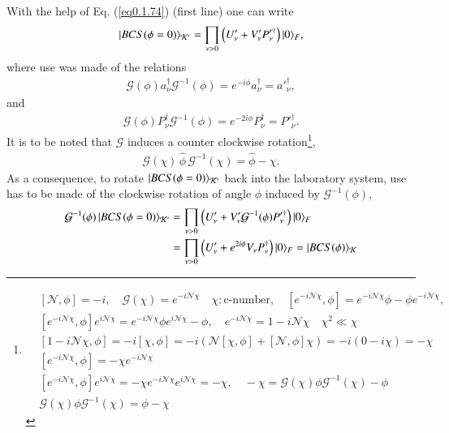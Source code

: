 With the help of Eq. (\ref{eq0.1.74}) (first line) one can write
\begin{align}\label{eq0.1.84}
|{BCS(\phi=0)} \rangle_{\mathcal K'}=\prod_{\nu>0}\left(U'_\nu+V'_\nu P_\nu'^\dagger\right)|{0} \rangle_F,
\end{align}
where use was made of the relations
\begin{align}\label{eq0.1.85}
\mathcal G(\phi)a^\dagger_\nu \mathcal G^{-1}(\phi)=e^{-i\phi}a^\dagger_\nu=a'^\dagger_\nu,
\end{align}
and 
\begin{align}\label{eq0.1.86}
\mathcal G(\phi)P^\dagger_\nu \mathcal G^{-1}(\phi)=e^{-2i\phi}P^\dagger_\nu=P'^\dagger_\nu.
\end{align}
It is to be noted that $\mathcal G$ induces a counter clockwise rotation\footnote{
	\begin{align*}
&[\mathcal N,\phi]=-i,\quad\mathcal G(\chi)=e^{-i\mathcal N\chi}\quad \chi:\text{c-number},\quad[e^{-i\mathcal N\chi},\phi]=e^{-i\mathcal N\chi}\phi-\phi e^{-i\mathcal N\chi},\\
&[e^{-i\mathcal N\chi},\phi]e^{i\mathcal N\chi}=e^{-i\mathcal N\chi}\phi e^{i\mathcal N\chi}-\phi,\quad e^{-i\mathcal N\chi}=1-i\mathcal N\chi\quad \chi^2\ll\chi\\
&[1-i\mathcal N\chi,\phi]=-i[\mathcal\chi,\phi]=-i\left(\mathcal N[\chi,\phi]+[\mathcal N,\phi]\chi\right)=-i(0-i\chi)=-\chi\\
&[e^{-i\mathcal N\chi},\phi]=-\chi e^{-i\mathcal N\chi}\\
&[e^{-i\mathcal N\chi},\phi]e^{i\mathcal N\chi}=-\chi e^{-i\mathcal N\chi}e^{i\mathcal N\chi}=-\chi,\quad -\chi=\mathcal G(\chi)\phi\mathcal G^{-1}(\chi)-\phi\\
&\mathcal G(\chi)\phi\mathcal G^{-1}(\chi)=\phi-\chi
	\end{align*}
},
\begin{align}\label{eq0.1.87}
\mathcal G(\chi)\,\hat\phi\, \mathcal G^{-1}(\chi)=\hat\phi-\chi.
\end{align}
As a consequence, to rotate $|{BCS(\phi=0)} \rangle_{\mathcal K'}$ back into the laboratory system, use has to be made of the clockwise rotation of angle $\phi$ induced by $\mathcal G^{-1}(\phi)$,
\begin{align}\label{eq0.1.88}
\nonumber \mathcal G^{-1}(\phi)\,|{BCS(\phi=0)} \rangle_{\mathcal K'}&=\prod_{\nu>0}\left(U'_\nu+V'_\nu\mathcal G^{-1}(\phi)P'^\dagger_\nu\right)|{0} \rangle_F\\
&=\prod_{\nu>0}\left(U'_\nu+e^{2i\phi}V_\nu P^\dagger_\nu\right)|{0} \rangle_F=|{BCS(\phi)} \rangle_{\mathcal K}
\end{align}
